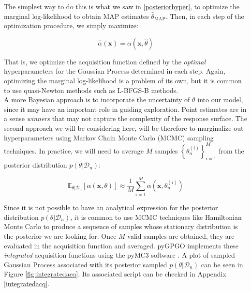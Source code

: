 \documentclass[10pt,a4paper,twoside]{book}
\begin{document}
The simplest way to do this is what we saw in \ref{posteriorhyper}, to optimize the marginal log-likelihood to obtain MAP estimates $\hat{\theta}_{\mathrm{MAP}}$. Then, in each step of the optimization procedure, we simply maximize:

\begin{equation}
\hat{\alpha}(\boldsymbol{x}) = \alpha(\boldsymbol{x}, \hat{\theta})
\end{equation}

That is, we optimize the acquisition function defined by the \textit{optimal} hyperparameters for the Gaussian Process determined in each step. Again, optimizing the marginal log-likelihood is a problem of its own, but it is common to use quasi-Newton methods such as L-BFGS-B methods.\\

A more Bayesian approach is to incorporate the uncertainty of $\theta$ into our model, since it may have an important role in guiding exploration. Point estimates are in a sense \textit{winners} that may not capture the complexity of the response surface. The second approach we will be considering here, will be therefore to marginalize out hyperparameters using Markov Chain Monte Carlo (MCMC) sampling techniques. In practice, we will need to average $M$ samples $\left\lbrace\theta_n^{(i)}\right\rbrace ^{M}_{i=1}$ from the posterior distribution $p(\theta|\mathcal{D}_n)$:

\begin{equation}
\mathbb{E}_{\theta|\mathcal{D}_n}\left[ \alpha(\boldsymbol{x},\theta )\right] \approx \dfrac{1}{M} \sum_{i=1}^M \alpha(\boldsymbol{x},\theta_n^{(i)})
\end{equation}

Since it is not possible to have an analytical expression for the posterior distribution $p(\theta|\mathcal{D}_n)$, it is common to use MCMC techniques like Hamiltonian Monte Carlo \cite{Neal2011} to produce a sequence of samples whose stationary distribution is the posterior we are looking for. Once $M$ valid samples are obtained, they are evaluated in the acquisition function and averaged. pyGPGO implements these \textit{integrated} acquisition functions using the pyMC3 software \cite{Coyle2015}. A plot of sampled Gaussian Process associated with its posterior sampled $p(\theta|\mathcal{D}_n)$ can be seen in Figure  \ref{fig:integratedacq}. Its associated script can be checked in Appendix \ref{integratedacq}.
\end{document}
